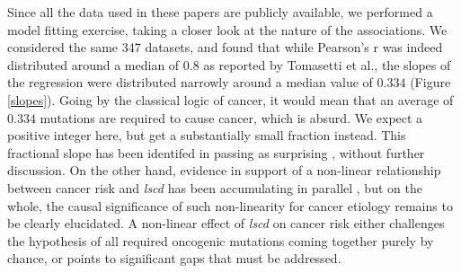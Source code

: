 \documentclass[9pt,twocolumn,twoside]{pnas-new}
\begin{document}
		Since all the data used in these papers are publicly available, we performed a model fitting exercise, taking a closer look at the nature of the associations. We considered the same 347 datasets, and found that while Pearson's r was indeed distributed around a median of $0.8$ as reported by Tomasetti et al., the slopes of the regression were distributed narrowly around a median value of $0.334$ (Figure \ref{slopes}). Going by the classical logic of cancer, it would mean that an average of $0.334$ mutations are required to cause cancer, which is absurd. We expect a positive integer here, but get a substantially small fraction instead. This fractional slope has been identifed in passing as surprising \cite{Nowak1266}, without further discussion. On the other hand, evidence in support of a non-linear relationship between cancer risk and \textit{lscd} has been accumulating in parallel \cite{Noble2015}, but on the whole, the causal significance of such non-linearity for cancer etiology remains to be clearly elucidated. A non-linear effect of \textit{lscd} on cancer risk either challenges the hypothesis of all required oncogenic mutations coming together purely by chance, or points to significant gaps that must be addressed.
	
\end{document}
